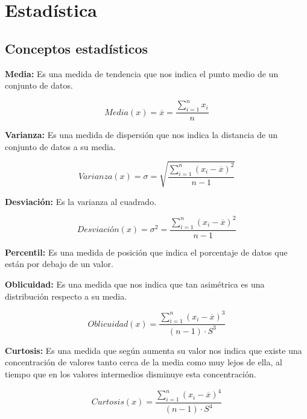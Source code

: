 \section{Estadística} \label{estadistica}

\subsection{Conceptos estadísticos}
\textbf{Media:} Es una medida de tendencia que nos indica el punto medio de un conjunto de datos\cite{media}.

\begin{equation} 
Media(x) = \overline{x} = \frac{\sum_{i=1}^{n}x_{i}}{n}
\end{equation}

\textbf{Varianza:} Es una medida de dispersión que nos indica la distancia de un conjunto de datos a su media\cite{varianza}.

\begin{equation} 
Varianza(x) =  \sigma = \sqrt{\frac{\sum_{i=1}^{n}(x_{i}-\overline{x})^{2}}{n-1}}
\end{equation}

\textbf{Desviación:} Es la varianza al cuadrado\cite{varianza}.

\begin{equation} 
Desviación(x) =  \sigma^{2} = \frac{\sum_{i=1}^{n}(x_{i}-\overline{x})^{2}}{n-1}
\end{equation}

\textbf{Percentil:} Es una medida de posición que indica el porcentaje de datos que están por debajo de un valor\cite{percentil}. \label{percentil}

\textbf{Oblicuidad:} Es una medida que nos indica que tan asimétrica es una distribución respecto a su media\cite{oblicuidad}.

\begin{equation} 
Oblicuidad(x) = \frac{\sum_{i=1}^{n}(x_{i}-\overline{x})^3}{(n-1)\cdot S^3}
\end{equation}

\textbf{Curtosis:} Es una medida que según aumenta su valor nos indica que existe una concentración de valores tanto cerca de la media como muy lejos de ella, al tiempo que en los valores intermedios disminuye esta concentración\cite{curtosis}. 

\begin{equation} 
Curtosis(x) = \frac{\sum_{i=1}^{n}(x_{i}-\overline{x})^4}{(n-1)\cdot S^4}
\end{equation}
	
